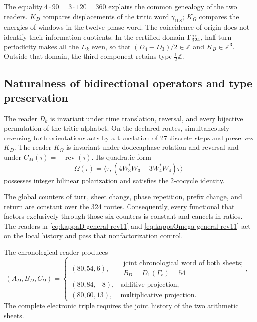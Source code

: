 The equality \(4\cdot90=3\cdot120=360\) explains the common genealogy of
the two readers. \(K_D\) compares displacements of the tritic word
\(\gamma_{108}\);
\(K_\Omega\) compares the energies of windows in the twelve-phase word. The
coincidence of origin does not identify their information quotients.
In the certified domain \(\Gamma_{324}^{\rm or}\), half-turn periodicity
makes all the \(D_k\) even, so that
\((D_4-D_3)/2\in\mathbb Z\) and \(K_D\in\mathbb Z^3\). Outside that domain,
the third component retains type \(\tfrac12\mathbb Z\).

\subsection{Naturalness of bidirectional operators and type preservation}

The reader \(D_k\) is invariant under time translation, reversal, and every
bijective permutation of the tritic alphabet. On the declared routes,
simultaneously reversing both orientations acts by a translation of
27 discrete steps and preserves \(K_D\). The reader \(K_\Omega\) is invariant under
dodecaphase rotation and reversal and under
\(C_M(\tau)=-\operatorname{rev}(\tau)\). Its quadratic form
\[
 \Omega(\tau)=\langle\tau,
 (4W_3^*W_3-3W_4^*W_4)\tau\rangle
\]
possesses integer bilinear polarization and satisfies the 2-cocycle identity.

The global counters of turn, sheet change, phase repetition, prefix change, and return are constant over the 324 routes. Consequently, every functional that factors exclusively through those six counters is constant and cancels in ratios. The readers in \eqref{eq:kappaD-general-rev11} and \eqref{eq:kappaOmega-general-rev11} act on the local history and pass that nonfactorization control.

\begin{ablation}
\label{abl:hojas-lector-two-way-rev11}
The chronological reader produces
\[
 (A_D,B_D,C_D)=
 \begin{cases}
 (80,54,6),&\substack{\text{joint chronological word of both sheets;}\\
 B_D=D_1(\Gamma_e)=54},\\
 (80,84,-8),&\text{additive projection},\\
 (80,60,13),&\text{multiplicative projection}.
 \end{cases}
\]
The complete electronic triple requires the joint history of the two arithmetic sheets.
\end{ablation}

